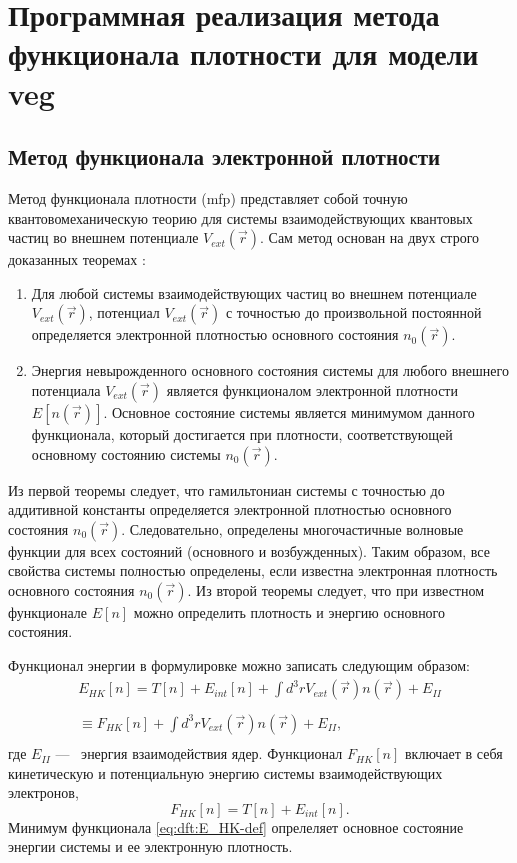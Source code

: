 
\chapter{Программная реализация метода функционала плотности для модели \texorpdfstring{\acrshort{veg}}{ВЭГ}}

\section{Метод функционала электронной плотности}
Метод функционала плотности (\acrshort{mfp}) представляет собой точную\\ квантовомеханическую теорию для системы взаимодействующих квантовых частиц во внешнем потенциале $V_{ext} (\vec{r})$.
Сам метод основан на двух строго доказанных теоремах \cite{hohenberg:dft}:
\begin{enumerate}
    \item Для любой системы взаимодействующих частиц во внешнем потенциале $V_{ext} (\vec{r})$, потенциал $V_{ext} (\vec{r})$ с точностью до произвольной постоянной определяется электронной плотностью основного состояния $n_0 (\vec{r})$.
    \item Энергия невырожденного основного состояния системы для любого внешнего потенциала $V_{ext} (\vec{r})$ является функционалом электронной плотности $E[n(\vec{r})]$. Основное состояние системы является минимумом данного функционала, который достигается при плотности, соответствующей основному состоянию системы $n_0 (\vec{r})$.
\end{enumerate}

Из первой теоремы следует, что гамильтониан системы с точностью до аддитивной константы определяется электронной плотностью основного состояния $n_0 (\vec{r})$.
Следовательно, определены многочастичные волновые функции для всех состояний (основного и возбужденных).
Таким образом, все свойства системы полностью определены, если известна электронная плотность основного состояния $n_0 (\vec{r})$.
Из второй теоремы следует, что при известном функционале $E[n]$ можно определить плотность и энергию основного состояния.

Функционал энергии в формулировке \cite{hohenberg:dft} можно записать следующим образом:
\begin{multline}
    \label{eq:dft:E_HK-def}
    E_{HK} [n] = T[n] + E_{int} [n] + \int\limits_{}^{} d^3 r V_{ext} (\vec{r}) n(\vec{r}) + E_{II} \\
    \equiv F_{HK} [n] + \int\limits_{}^{}d^3 r V_{ext} (\vec{r}) n(\vec{r}) + E_{II},
\end{multline}
где $E_{II} $ ---~ энергия взаимодействия ядер. Функционал $F_{HK} [n]$ включает в себя кинетическую и потенциальную энергию системы взаимодействующих электронов,
\begin{equation}
    \label{eq:dft:F_HK-def}
    F_{HK} [n] = T[n] + E_{i n t} [n]. 
\end{equation}
Минимум функционала \eqref{eq:dft:E_HK-def} опрелеляет основное состояние энергии системы и ее электронную плотность.

